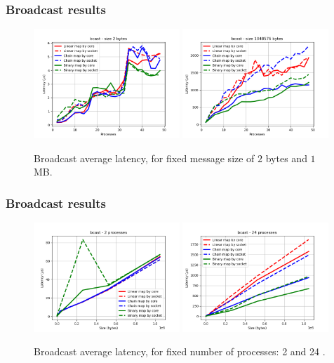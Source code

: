 \documentclass{beamer}
\begin{document}
\begin{frame}
\frametitle{Broadcast results}

\begin{figure}
    \centering
    \includegraphics[width=0.49\textwidth]{../plots/bcast_fixedSize2.png}
    \includegraphics[width=0.49\textwidth]{../plots/bcast_fixedSize1048576.png}
    \caption{Broadcast average latency, for fixed message size of $2$ bytes and $1$ MB.}
\end{figure}

\end{frame}

\begin{frame}
    \frametitle{Broadcast results}
    
    \begin{figure}
        \centering
        \includegraphics[width=0.49\textwidth]{../plots/bcast_fixedprocesses2.png}
        \includegraphics[width=0.49\textwidth]{../plots/bcast_fixedprocesses24.png}
        \caption{Broadcast average latency, for fixed number of processes: 2 and 24 .}
    \end{figure}
    
\end{frame}
\end{document}
